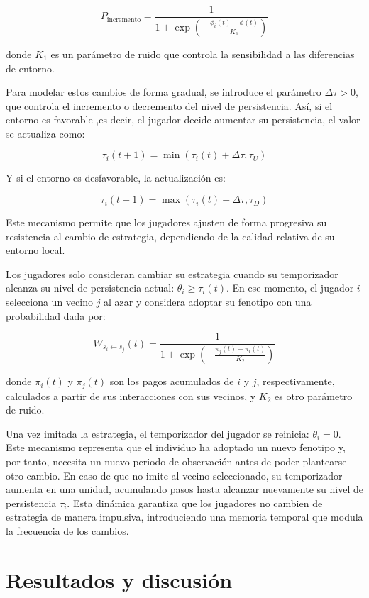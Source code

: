 \documentclass[a4paper,12pt]{report}
\begin{document}
\[
P_{\text{incremento}} = \frac{1}{1 + \exp\left( -\frac{ \phi_i(t) - \phi(t) }{K_1} \right)}
\]

donde \( K_1 \) es un parámetro de ruido que controla la sensibilidad a las diferencias de entorno.

Para modelar estos cambios de forma gradual, se introduce el parámetro \( \Delta\tau > 0 \), que controla el incremento o decremento del nivel de persistencia. Así, si el entorno es favorable ,es decir, el jugador decide aumentar su persistencia, el valor se actualiza como:

\[
\tau_i(t+1) = \min(\tau_i(t) + \Delta\tau, \tau_U)
\]

Y si el entorno es desfavorable, la actualización es:

\[
\tau_i(t+1) = \max(\tau_i(t) - \Delta\tau, \tau_D)
\]

Este mecanismo permite que los jugadores ajusten de forma progresiva su resistencia al cambio de estrategia, dependiendo de la calidad relativa de su entorno local.

Los jugadores solo consideran cambiar su estrategia cuando su temporizador alcanza su nivel de persistencia actual: \( \theta_i \geq \tau_i(t) \). En ese momento, el jugador \( i \) selecciona un vecino \( j \) al azar y considera adoptar su fenotipo con una probabilidad dada por:

\[
W_{s_i \leftarrow s_j}(t) = \frac{1}{1 + \exp\left( -\frac{ \pi_j(t) - \pi_i(t) }{K_2} \right)}
\]

donde \( \pi_i(t) \) y \( \pi_j(t) \) son los pagos acumulados de \( i \) y \( j \), respectivamente, calculados a partir de sus interacciones con sus vecinos, y \( K_2 \) es otro parámetro de ruido.

Una vez imitada la estrategia, el temporizador del jugador se reinicia: \( \theta_i = 0 \). Este mecanismo representa que el individuo ha adoptado un nuevo fenotipo y, por tanto, necesita un nuevo periodo de observación antes de poder plantearse otro cambio. En caso de que no imite al vecino seleccionado, su temporizador aumenta en una unidad, acumulando pasos hasta alcanzar nuevamente su nivel de persistencia \( \tau_i \). Esta dinámica garantiza que los jugadores no cambien de estrategia de manera impulsiva, introduciendo una memoria temporal que modula la frecuencia de los cambios.


\chapter{Resultados y discusión}
\end{document}
